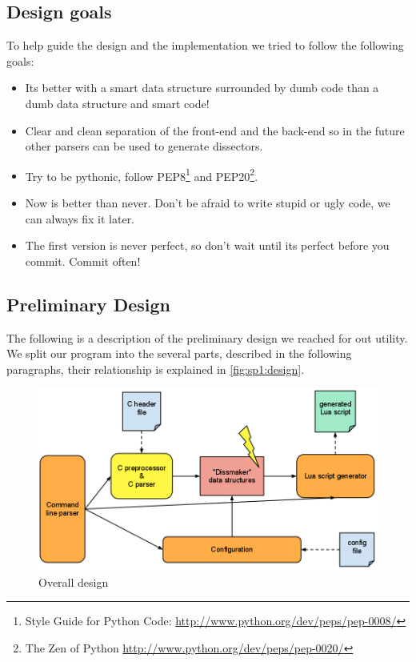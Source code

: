 \subsection{Design goals}
To help guide the design and the implementation we tried to follow the
following goals:
\begin{itemize}
	\item Its better with a smart data structure surrounded by dumb code than
		a dumb data structure and smart code!
	\item Clear and clean separation of the front-end and the back-end so in the
		future other parsers can be used to generate dissectors.
	\item Try to be pythonic, follow
		PEP8\footnote{Style Guide for Python Code: \url{http://www.python.org/dev/peps/pep-0008/}} and
		PEP20\footnote{The Zen of Python \url{http://www.python.org/dev/peps/pep-0020/}}.
	\item Now is better than never. Don't be afraid to write stupid or ugly
		code, we can always fix it later.
	\item The first version is never perfect, so don't wait until its perfect
		before you commit. Commit often!
\end{itemize}

\subsection{Preliminary Design}
The following is a description of the preliminary design we reached for out
utility. We split our program into the several parts, described in the
following paragraphs, their relationship is explained in
\autoref{fig:sp1:design}.

\begin{figure}[!htb]
	\center
	\includegraphics[width=\textwidth]{./sprints/img/design}
	\caption{Overall design\label{fig:sp1:design}}
\end{figure}

